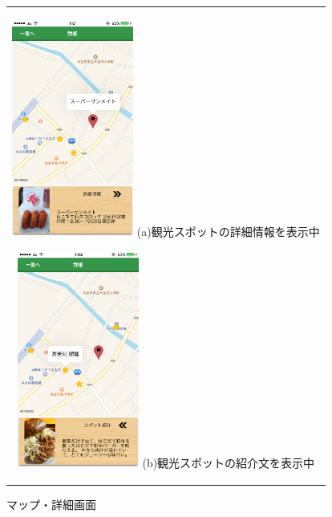 \begin{figure}[htbp]
  \begin{center}
    \begin{tabular}{c}

      \begin{minipage}{0.33\hsize}
        \begin{center}
\includegraphics[width=4cm, bb=0 0 705 1334]{kiko_map1.png}
          \hspace{1cm} (a)観光スポットの詳細情報を表示中
        \end{center}
      \end{minipage}

      \begin{minipage}{0.33\hsize}
        \begin{center}
\includegraphics[width=4cm, bb=0 0 705 1334]{kiko_map2.png}
          \hspace{1cm} (b)観光スポットの紹介文を表示中
        \end{center}
      \end{minipage}

    \end{tabular}
    \caption{マップ・詳細画面}
    \label{fig:lena}
  \end{center}
\end{figure}
\

